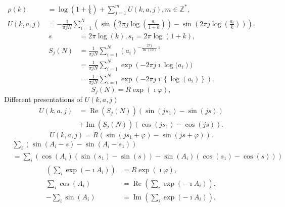 \documentclass[titlepage,fleqn]{article}%
\providecommand{\U}[1]{\protect\rule{.1in}{.1in}}
\begin{document}
\begin{align*}
\rho(k) &  =\log\left(  1+\frac{1}{k}\right)  +%
{\displaystyle\sum\limits_{j=1}^{m}}
U(k,a,j),m\in%
\mathbb{Z}
^{\ast},\\
U(k,a,j) &  =-\frac{1}{\pi jN}%
{\displaystyle\sum\limits_{i=1}^{N}}
\left(  \sin\left(  2\pi j\log\left(  \frac{a_{i}}{1+k}\right)  \right)
-\sin\left(  2\pi j\log\left(  \frac{a_{i}}{k}\right)  \right)  \right)  .
\end{align*}%
\begin{align*}
s &  =2\pi\log(k),s_{1}=2\pi\log(1+k),\\
S_{j}(N) &  =\frac{1}{\pi jN}%
{\displaystyle\sum\limits_{i=1}^{N}}
\left(  a_{i}\right)  ^{-\frac{2\pi j}{\ln(10)}\imath}\\
&  =\frac{1}{\pi jN}%
{\displaystyle\sum\limits_{i=1}^{N}}
\exp\left(  -2\pi j\imath\log(a_{i}\right)  )\\
&  =\frac{1}{\pi jN}%
{\displaystyle\sum\limits_{i=1}^{N}}
\exp\left(  -2\pi j\imath\left\{  \log\left(  a_{i}\right)  \right\}  \right)
.
\end{align*}%
\[
S_{j}(N)=R\exp(\imath\varphi),
\]
Different presentations of $U(k,a,j)$
\begin{align*}
U(k,a,j) &  =\operatorname{Re}(S_{j}(N))\left(  \sin(js_{1})-\sin(js)\right)
\\
&  +\operatorname{Im}(S_{j}(N))\left(  \cos(js_{1})-\cos(js)\right)  .
\end{align*}%
\[
U(k,a,j)=R\left(  \sin(js_{1}+\varphi)-\sin(js+\varphi)\right)  .
\]%
\begin{align*}
&
{\displaystyle\sum\limits_{i}}
\left(  \sin(A_{i}-s)-\sin(A_{i}-s_{1})\right)  \\
&  =%
{\displaystyle\sum\limits_{i}}
\left(  \cos(A_{i})(\sin(s_{1})-\sin(s))-\sin(A_{i})(\cos(s_{1})-\cos
(s))\right)
\end{align*}%
\begin{align*}
\left(
{\displaystyle\sum\limits_{i}}
\exp(-\imath A_{i})\right)   &  =R\exp(\imath\varphi),\\%
{\displaystyle\sum\limits_{i}}
\cos(A_{i}) &  =\operatorname{Re}\left(
{\displaystyle\sum\limits_{i}}
\exp(-\imath A_{i})\right)  ,\\
-%
{\displaystyle\sum\limits_{i}}
\sin(A_{i}) &  =\operatorname{Im}\left(
{\displaystyle\sum\limits_{i}}
\exp(-\imath A_{i})\right)  .
\end{align*}
%
\end{document}
